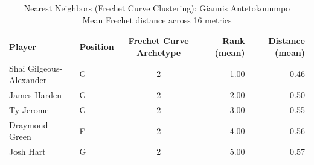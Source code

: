 \begin{table}[t]
\caption*{
{\fontsize{20}{25} Nearest Neighbors (Frechet Curve Clustering): Giannis Antetokounmpo\fontsize{12}{15}\selectfont } \\ 
{\fontsize{14}{17}\selectfont  Mean Frechet distance across 16 metrics\fontsize{12}{15}\selectfont }
} 
\fontsize{12.0pt}{14.0pt}\selectfont
\begin{tabular*}{\linewidth}{@{\extracolsep{\fill}}llcrr}
\toprule
Player & Position & Frechet Curve Archetype & Rank (mean) & Distance (mean) \\ 
\midrule\addlinespace[2.5pt]
Shai Gilgeous-Alexander & G & 2 & 1.00 & 0.46 \\ 
James Harden & G & 2 & 2.00 & 0.50 \\ 
Ty Jerome & G & 2 & 3.00 & 0.55 \\ 
Draymond Green & F & 2 & 4.00 & 0.56 \\ 
Josh Hart & G & 2 & 5.00 & 0.57 \\ 
\bottomrule
\end{tabular*}
\end{table}

